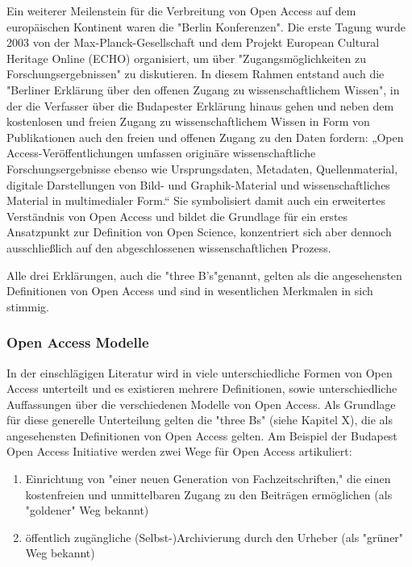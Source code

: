 {Ein weiterer Meilenstein für die Verbreitung von Open Access auf dem europäischen Kontinent waren die "Berlin Konferenzen"\cite{CREATe_2014}. Die erste Tagung wurde 2003 von der Max-Planck-Gesellschaft und dem Projekt European Cultural Heritage Online (ECHO) organisiert, um über "Zugangsmöglichkeiten zu Forschungsergebnissen" zu diskutieren. In diesem Rahmen entstand auch die "Berliner Erklärung über den offenen Zugang zu wissenschaftlichem Wissen"\cite{berliner_erklaerung_2003}, in der die Verfasser über die Budapester Erklärung hinaus gehen und neben dem kostenlosen und freien Zugang zu wissenschaftlichem Wissen in Form von Publikationen auch den freien und offenen Zugang zu den Daten fordern: „Open Access-Veröffentlichungen umfassen originäre wissenschaftliche Forschungsergebnisse ebenso wie Ursprungsdaten, Metadaten, Quellenmaterial, digitale Darstellungen von Bild- und Graphik-Material und wissenschaftliches Material in multimedialer Form.“\cite{berliner_erklaerung_2003} Sie symbolisiert damit auch ein erweitertes Verständnis von Open Access und bildet die Grundlage für ein erstes Ansatzpunkt zur Definition von Open Science, konzentriert sich aber dennoch ausschließlich auf den abgeschlossenen wissenschaftlichen Prozess\cite{suchen}.

Alle drei Erklärungen, auch die "three B's"\cite{suber_2004_praising_oa}genannt, gelten als die angesehensten Definitionen von Open Access und sind in wesentlichen Merkmalen in sich stimmig\cite{albert_2006_open_implications}.

\subsubsection{Open Access Modelle}

In der einschlägigen Literatur wird in viele unterschiedliche Formen von Open Access unterteilt und es existieren mehrere Definitionen\cite{CREATe_2014}\cite{albert_2006_open_implications}, sowie unterschiedliche Auffassungen über die verschiedenen Modelle von Open Access\cite{CREATe_2014}\cite{cite:22b}\cite{lewis_2012_inevitability}. Als Grundlage für diese generelle Unterteilung gelten die "three Bs" (siehe Kapitel X), die als angesehensten Definitionen von Open Access gelten. Am Beispiel der Budapest Open Access Initiative werden zwei Wege für Open Access artikuliert\cite{albert_2006_open_implications}: 
\begin{enumerate}
\item Einrichtung von "einer neuen Generation von Fachzeitschriften," die einen kostenfreien und unmittelbaren Zugang zu den Beiträgen ermöglichen (als "goldener" Weg bekannt)
\item öffentlich zugängliche (Selbst-)Archivierung durch den Urheber (als "grüner" Weg bekannt)
\end{enumerate}

}
